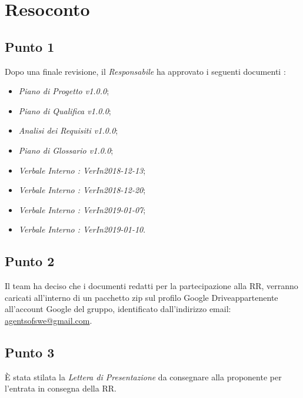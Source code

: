 \section{Resoconto}

\subsection{Punto 1}

Dopo una finale revisione, il \textit{Responsabile} ha approvato i seguenti documenti :
\begin{itemize}
	\item \textit{Piano di Progetto v1.0.0};
	\item \textit{Piano di Qualifica v1.0.0};
	\item \textit{Analisi dei Requisiti v1.0.0};
	\item \textit{Piano di Glossario v1.0.0};
	\item \textit{Verbale Interno : VerIn2018-12-13};
	\item \textit{Verbale Interno : VerIn2018-12-20};
	\item \textit{Verbale Interno : VerIn2019-01-07};
	\item \textit{Verbale Interno : VerIn2019-01-10}.
\end{itemize}

\subsection{Punto 2}
Il team ha deciso che i documenti redatti per la partecipazione alla RR, verranno caricati all'interno di un pacchetto zip sul profilo Google Drive\glossario appartenente all'account Google del gruppo, identificato dall'indirizzo email: \href{mailto:agentsofswe@gmail.com}{agentsofswe@gmail.com}.

\subsection{Punto 3}
È stata stilata la \textit{Lettera di Presentazione} da consegnare alla proponente per l'entrata in consegna della RR.

